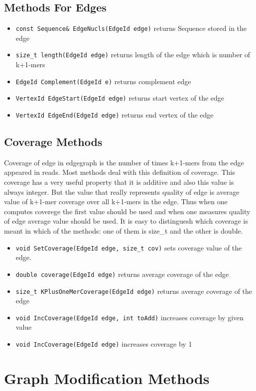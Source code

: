 \documentclass[a4paper,10pt]{article}
\begin{document}
\subsection*{Methods For Edges}
\begin{itemize}
\item \texttt{const Sequence\& EdgeNucls(EdgeId edge)} returns Sequence stored in the edge
\item \texttt{size\_t length(EdgeId edge)} returns length of the edge which is number of k+1-mers
\item \texttt{EdgeId Complement(EdgeId e)} returns complement edge
\item \texttt{VertexId EdgeStart(EdgeId edge)} returns start vertex of the edge
\item \texttt{VertexId EdgeEnd(EdgeId edge)} returns end vertex of the edge
\end{itemize}

\subsection*{Coverage Methods}
Coverage of edge in edgegraph is the number of times k+1-mers from the edge appeared in reads. Most methods deal with this 
definition of coverage. This coverage has a very useful property that it is additive and also this value is always integer. 
But the value that really represents quality of edge is average value of k+1-mer coverage over all k+1-mers in the edge.
Thus when one computes coverege the first value should be used and when one measures quality of edge average value should be used.
It is easy to distinguesh which coverage is meant in which of the methods: one of them is size\_t and the other is double.

\begin{itemize}
\item \texttt{void SetCoverage(EdgeId edge, size\_t cov)} sets coverage value of the edge.
\item \texttt{double coverage(EdgeId edge)} returns average coverage of the edge
\item \texttt{size\_t KPlusOneMerCoverage(EdgeId edge)} returns average coverage of the edge
\item \texttt{void IncCoverage(EdgeId edge, int toAdd)} increases coverage by given value
\item \texttt{void IncCoverage(EdgeId edge)} increases coverage by 1
\end{itemize}

\section{Graph Modification Methods}
\end{document}
